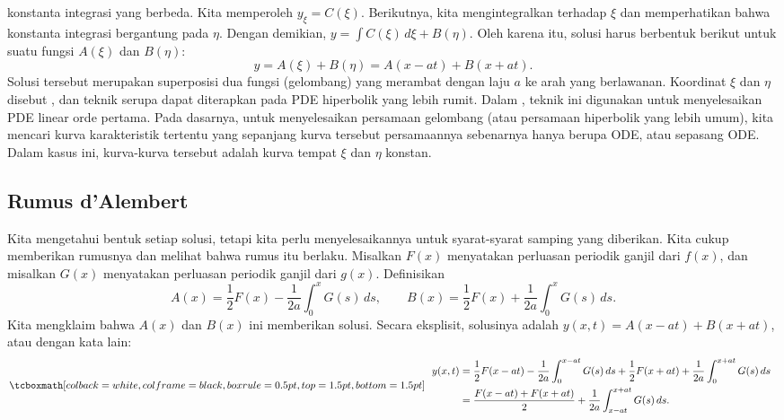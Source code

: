 konstanta integrasi yang berbeda.  Kita memperoleh
$y_{\xi} = C(\xi)$.
Berikutnya, kita mengintegralkan terhadap $\xi$ dan memperhatikan bahwa konstanta
integrasi bergantung pada $\eta$.
Dengan demikian,
$y = \int C(\xi) \, d\xi + B(\eta)$.
Oleh karena itu, solusi harus berbentuk berikut untuk suatu fungsi
$A(\xi)$ dan $B(\eta)$:
\begin{equation*}
y = A(\xi) + B(\eta) = A(x-at) + B(x+at) .
\end{equation*}
Solusi tersebut merupakan superposisi dua fungsi (gelombang) yang merambat dengan laju
$a$
ke arah yang berlawanan.  Koordinat $\xi$ dan $\eta$ disebut
\emph{}, dan teknik serupa dapat
diterapkan pada PDE hiperbolik yang lebih rumit.
Dalam , teknik ini digunakan untuk menyelesaikan
PDE linear orde pertama.
Pada dasarnya, untuk menyelesaikan persamaan gelombang (atau persamaan
hiperbolik yang lebih umum), kita mencari kurva karakteristik tertentu yang sepanjang kurva tersebut
persamaannya sebenarnya hanya berupa ODE\@, atau sepasang ODE.  Dalam kasus ini,
kurva-kurva tersebut adalah kurva tempat $\xi$ dan $\eta$ konstan.

\subsection{Rumus d'Alembert}

Kita mengetahui bentuk setiap solusi, tetapi kita perlu menyelesaikannya untuk
syarat-syarat samping yang diberikan.  Kita cukup memberikan rumusnya dan melihat bahwa rumus itu berlaku.
Misalkan $F(x)$
menyatakan perluasan periodik ganjil dari $f(x)$, dan misalkan $G(x)$ menyatakan
perluasan periodik ganjil dari $g(x)$.  Definisikan
\begin{equation*}
A(x) = \frac{1}{2} F(x) - \frac{1}{2a} \int_0^x G(s) \,ds ,
\qquad
B(x) = \frac{1}{2} F(x) + \frac{1}{2a} \int_0^x G(s) \,ds .
\end{equation*}
Kita mengklaim bahwa $A(x)$ dan $B(x)$ ini memberikan solusi.  Secara eksplisit,
solusinya adalah $y(x,t) = A(x-at) + B(x+at)$, atau dengan kata lain:
\begin{equation} \label{dalemb:form}
\mybxbg{~~
\begin{aligned}
y(x,t) & =
\frac{1}{2} F(x-at) - \frac{1}{2a} \int_0^{x-at} G(s) \,ds 
+
\frac{1}{2} F(x+at) + \frac{1}{2a} \int_0^{x+at} G(s) \,ds \\
& =
\frac{F(x-at) + F(x+at)}{2} + \frac{1}{2a} \int_{x-at}^{x+at} G(s) \,ds .
\end{aligned}
~~}
\end{equation}

